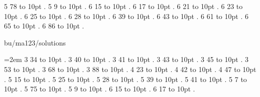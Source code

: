  5 78 \leaders\hbox to 10pt {\hss.\hss}  \hfill {}
 5 9 \leaders\hbox to 10pt {\hss.\hss}  \hfill {}
 6 15 \leaders\hbox to 10pt {\hss.\hss}  \hfill {}
 6 17 \leaders\hbox to 10pt {\hss.\hss}  \hfill {}
 6 21 \leaders\hbox to 10pt {\hss.\hss}  \hfill {}
 6 23 \leaders\hbox to 10pt {\hss.\hss}  \hfill {}
 6 25 \leaders\hbox to 10pt {\hss.\hss}  \hfill {}
 6 28 \leaders\hbox to 10pt {\hss.\hss}  \hfill {}
 6 39 \leaders\hbox to 10pt {\hss.\hss}  \hfill {}
 6 43 \leaders\hbox to 10pt {\hss.\hss}  \hfill {}
 6 61 \leaders\hbox to 10pt {\hss.\hss}  \hfill {}
 6 65 \leaders\hbox to 10pt {\hss.\hss}  \hfill {}
 6 86 \leaders\hbox to 10pt {\hss.\hss}  \hfill {}
\smallskip
\par\endgroup
\bigskip
{}
bu/ma123/solutions
\par\begingroup
\leftskip=2em
\smallskip
{} 3 34 \leaders\hbox to 10pt {\hss.\hss}  \hfill {}
 3 40 \leaders\hbox to 10pt {\hss.\hss}  \hfill {}
 3 41 \leaders\hbox to 10pt {\hss.\hss}  \hfill {}
 3 43 \leaders\hbox to 10pt {\hss.\hss}  \hfill {}
 3 45 \leaders\hbox to 10pt {\hss.\hss}  \hfill {}
 3 53 \leaders\hbox to 10pt {\hss.\hss}  \hfill {}
 3 68 \leaders\hbox to 10pt {\hss.\hss}  \hfill {}
 3 88 \leaders\hbox to 10pt {\hss.\hss}  \hfill {}
 4 23 \leaders\hbox to 10pt {\hss.\hss}  \hfill {}
 4 42 \leaders\hbox to 10pt {\hss.\hss}  \hfill {}
 4 47 \leaders\hbox to 10pt {\hss.\hss}  \hfill {}
 5 15 \leaders\hbox to 10pt {\hss.\hss}  \hfill {}
 5 25 \leaders\hbox to 10pt {\hss.\hss}  \hfill {}
 5 28 \leaders\hbox to 10pt {\hss.\hss}  \hfill {}
 5 39 \leaders\hbox to 10pt {\hss.\hss}  \hfill {}
 5 41 \leaders\hbox to 10pt {\hss.\hss}  \hfill {}
 5 7 \leaders\hbox to 10pt {\hss.\hss}  \hfill {}
 5 75 \leaders\hbox to 10pt {\hss.\hss}  \hfill {}
 5 9 \leaders\hbox to 10pt {\hss.\hss}  \hfill {}
 6 15 \leaders\hbox to 10pt {\hss.\hss}  \hfill {}
 6 17 \leaders\hbox to 10pt {\hss.\hss}  \hfill {}
\smallskip
